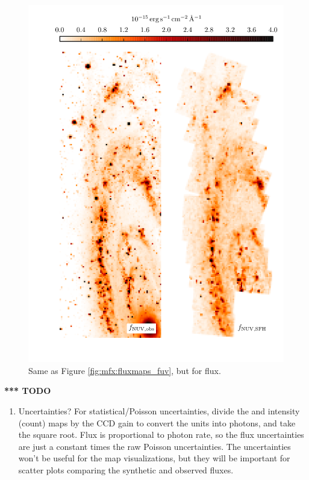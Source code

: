 \begin{figure}
\centering
\includegraphics[width=\textwidth]{m31flux-figures/fluxmaps_nuv.pdf}
\caption[Observed and synthetic reddened \nuv{} flux maps.]{Same as Figure
    \ref{fig:mfx:fluxmaps_fuv}, but for \nuv{} flux.
}
\label{fig:mfx:fluxmaps_nuv}
\end{figure}


\textbf{*** TODO}

\begin{enumerate}
\item Uncertainties? For statistical/Poisson uncertainties, divide the \fuv{}
    and \nuv{} intensity (count) maps by the CCD gain to convert the units into
    photons, and take the square root. Flux is proportional to photon rate, so
    the flux uncertainties are just a constant times the raw Poisson
    uncertainties. The uncertainties won't be useful for the map
    visualizations, but they will be important for scatter plots comparing the
    synthetic and observed fluxes.
\end{enumerate}

